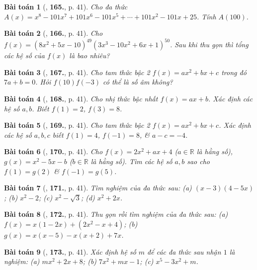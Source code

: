 \documentclass{article}
\numberwithin{equation}{section}
\newtheorem{baitoan}{Bài toán}
\begin{document}
\begin{baitoan}[\cite{Tuyen_Toan_7}, \textbf{165.}, p. 41]
	Cho đa thức $A(x) = x^8 - 101x^7 + 101x^6 - 101x^5 + \cdots + 101x^2 - 101x + 25$. Tính $A(100)$.
\end{baitoan}

\begin{baitoan}[\cite{Tuyen_Toan_7}, \textbf{166.}, p. 41]
	Cho $f(x) = (8x^2 + 5x - 10)^{49}(3x^3 - 10x^2 + 6x + 1)^{50}$. Sau khi thu gọn thì tổng các hệ số của $f(x)$ là bao nhiêu?
\end{baitoan}

\begin{baitoan}[\cite{Tuyen_Toan_7}, \textbf{167.}, p. 41]
	Cho tam thức bậc 2 $f(x) = ax^2 + bx + c$ trong đó $7a + b = 0$. Hỏi $f(10)f(-3)$ có thể là số âm không?
\end{baitoan}

\begin{baitoan}[\cite{Tuyen_Toan_7}, \textbf{168.}, p. 41]
	Cho nhị thức bậc nhất $f(x) = ax + b$. Xác định các hệ số $a,b$. Biết $f(1) = 2$, $f(3) = 8$.
\end{baitoan}

\begin{baitoan}[\cite{Tuyen_Toan_7}, \textbf{169.}, p. 41]
	Cho tam thức bậc 2 $f(x) = ax^2 + bx + c$. Xác định các hệ số $a,b,c$ biết $f(1) = 4$, $f(-1) = 8$, \& $a - c = -4$.
\end{baitoan}

\begin{baitoan}[\cite{Tuyen_Toan_7}, \textbf{170.}, p. 41]
	Cho $f(x) = 2x^2 + ax + 4$ ($a\in\mathbb{R}$ là hằng số), $g(x) = x^2 - 5x - b$ ($b\in\mathbb{R}$ là hằng số). Tìm các hệ số $a,b$ sao cho $f(1) = g(2)$ \& $f(-1) = g(5)$.
\end{baitoan}

\begin{baitoan}[\cite{Tuyen_Toan_7}, \textbf{171.}, p. 41]
	Tìm nghiệm của đa thức sau: (a) $(x - 3)(4 - 5x)$; (b) $x^2 - 2$; (c) $x^2 - \sqrt{3}$; (d) $x^2 + 2x$.
\end{baitoan}

\begin{baitoan}[\cite{Tuyen_Toan_7}, \textbf{172.}, p. 41]
	Thu gọn rồi tìm nghiệm của đa thức sau: (a) $f(x) = x(1 - 2x) + (2x^2 - x + 4)$; (b) $g(x) = x(x - 5) - x(x + 2) + 7x$.
\end{baitoan}

\begin{baitoan}[\cite{Tuyen_Toan_7}, \textbf{173.}, p. 41]
	Xác định hệ số $m$ để các đa thức sau nhận $1$ là nghiệm: (a) $mx^2 + 2x + 8$; (b) $7x^2 + mx - 1$; (c) $x^5 - 3x^2 + m$.
\end{baitoan}
\end{document}
